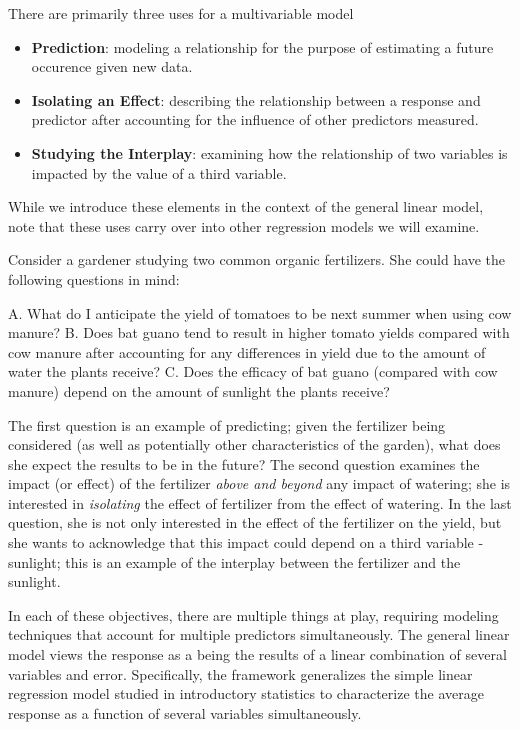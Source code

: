 \documentclass[
]{book}
\providecommand{\tightlist}{%
  \setlength{\itemsep}{0pt}\setlength{\parskip}{0pt}}
\theoremstyle{plain}
\theoremstyle{mydefn}
\theoremstyle{myexmpl}
\theoremstyle{remark}
\begin{document}
\begin{rmdkeyidea}
There are primarily three uses for a multivariable model

\begin{itemize}
\tightlist
\item
  \textbf{Prediction}: modeling a relationship for the purpose of estimating a future occurence given new data.
\item
  \textbf{Isolating an Effect}: describing the relationship between a response and predictor after accounting for the influence of other predictors measured.
\item
  \textbf{Studying the Interplay}: examining how the relationship of two variables is impacted by the value of a third variable.
\end{itemize}
\end{rmdkeyidea}

While we introduce these elements in the context of the general linear model, note that these uses carry over into other regression models we will examine.

Consider a gardener studying two common organic fertilizers. She could have the following questions in mind:

A. What do I anticipate the yield of tomatoes to be next summer when using cow manure?
B. Does bat guano tend to result in higher tomato yields compared with cow manure after accounting for any differences in yield due to the amount of water the plants receive?
C. Does the efficacy of bat guano (compared with cow manure) depend on the amount of sunlight the plants receive?

The first question is an example of predicting; given the fertilizer being considered (as well as potentially other characteristics of the garden), what does she expect the results to be in the future? The second question examines the impact (or effect) of the fertilizer \emph{above and beyond} any impact of watering; she is interested in \emph{isolating} the effect of fertilizer from the effect of watering. In the last question, she is not only interested in the effect of the fertilizer on the yield, but she wants to acknowledge that this impact could depend on a third variable - sunlight; this is an example of the interplay between the fertilizer and the sunlight.

In each of these objectives, there are multiple things at play, requiring modeling techniques that account for multiple predictors simultaneously. The general linear model views the response as a being the results of a linear combination of several variables and error. Specifically, the framework generalizes the simple linear regression model studied in introductory statistics to characterize the average response as a function of several variables simultaneously.
\end{document}
